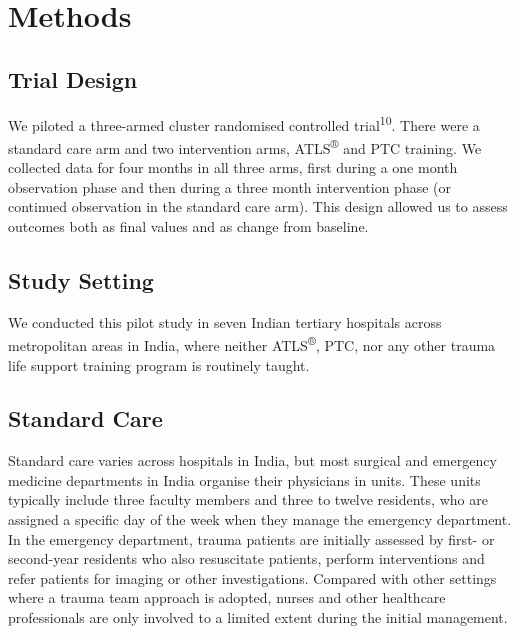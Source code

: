 \documentclass[
]{article}
\begin{document}
\hypertarget{methods}{%
\section{Methods}\label{methods}}

\hypertarget{trial-design}{%
\subsection{Trial Design}\label{trial-design}}

We piloted a three-armed cluster randomised controlled trial\textsuperscript{10}. There were a standard care arm and two intervention arms, ATLS\textsuperscript{®} and PTC training. We collected data for four months in all three arms, first during a one month observation phase and then during a three month intervention phase (or continued observation in the standard care arm). This design allowed us to assess outcomes both as final values and as change from baseline.

\hypertarget{study-setting}{%
\subsection{Study Setting}\label{study-setting}}

We conducted this pilot study in seven Indian tertiary hospitals across metropolitan areas in India, where neither ATLS\textsuperscript{®}, PTC, nor any other trauma life support training program is routinely taught.

\hypertarget{standard-care}{%
\subsection{Standard Care}\label{standard-care}}

Standard care varies across hospitals in India, but most surgical and emergency medicine departments in India organise their physicians in units. These units typically include three faculty members and three to twelve residents, who are assigned a specific day of the week when they manage the emergency department. In the emergency department, trauma patients are initially assessed by first- or second-year residents who also resuscitate patients, perform interventions and refer patients for imaging or other investigations. Compared with other settings where a trauma team approach is adopted, nurses and other healthcare professionals are only involved to a limited extent during the initial management.
\end{document}
